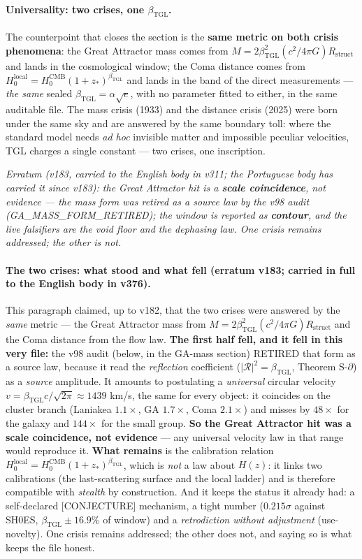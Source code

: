 \documentclass[11pt]{article}
\newcommand{\bTGL}{\beta_{\mathrm{TGL}}}\newcommand{\Msun}{M_{\odot}}\newcommand{\TGL}{\mathrm{TGL}}
\theoremstyle{definition}\newtheorem{deriv}{Derivation}
\begin{document}
\paragraph{Universality: two crises, one $\bTGL$.} The counterpoint that closes the section is the \textbf{same metric on both crisis phenomena}: the Great Attractor mass comes from $M=2\bTGL^2(c^2/4\pi G)R_{\mathrm{struct}}$ and lands in the cosmological window; the Coma distance comes from $H_0^{\mathrm{local}}=H_0^{\mathrm{CMB}}(1+z_*)^{\bTGL}$ and lands in the band of the direct measurements --- \emph{the same} sealed $\bTGL=\alpha\sqrt e$, with no parameter fitted to either, in the same auditable file. The mass crisis (1933) and the distance crisis (2025) were born under the same sky and are answered by the same boundary toll: where the standard model needs \emph{ad hoc} invisible matter and impossible peculiar velocities, TGL charges a single constant --- two crises, one inscription.

\emph{Erratum (v183, carried to the English body in v311; the Portuguese body has carried it since v183): the Great Attractor hit is a \textbf{scale coincidence}, not evidence --- the mass form was retired as a source law by the v98 audit (\textsf{GA\_MASS\_FORM\_RETIRED}); the window is reported as \textbf{contour}, and the live falsifiers are the void floor and the dephasing law. One crisis remains addressed; the other is not.}

\paragraph{The two crises: what stood and what fell (erratum v183; carried in full to the English body in v376).} This paragraph claimed, up to v182, that the two crises were answered by the \emph{same} metric --- the Great Attractor mass from $M=2\bTGL^2(c^2/4\pi G)R_{\mathrm{struct}}$ and the Coma distance from the flow law. \textbf{The first half fell, and it fell in this very file:} the v98 audit (below, in the GA-mass section) RETIRED that form as a source law, because it read the \emph{reflection} coefficient ($|\mathcal{R}|^2=\bTGL$, Theorem S-$\partial$) as a \emph{source} amplitude. It amounts to postulating a \emph{universal} circular velocity $v=\bTGL c/\sqrt{2\pi}\approx 1439$ km/s, the same for every object: it coincides on the cluster branch (Laniakea $1.1\times$, GA $1.7\times$, Coma $2.1\times$) and misses by $48\times$ for the galaxy and $144\times$ for the small group. \textbf{So the Great Attractor hit was a scale coincidence, not evidence} --- any universal velocity law in that range would reproduce it. \textbf{What remains} is the calibration relation $H_0^{\mathrm{local}}=H_0^{\mathrm{CMB}}(1+z_*)^{\bTGL}$, which is \emph{not} a law about $H(z)$: it links two calibrations (the last-scattering surface and the local ladder) and is therefore compatible with \emph{stealth} by construction. And it keeps the status it already had: a self-declared \textsf{[CONJECTURE]} mechanism, a tight number ($0.215\sigma$ against SH0ES, $\bTGL\pm16.9\%$ of window) and a \emph{retrodiction without adjustment} (use-novelty). One crisis remains addressed; the other does not, and saying so is what keeps the file honest.
\end{document}
